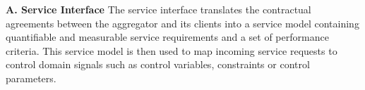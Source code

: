 \textbf{A. Service Interface}
The service interface translates the contractual agreements between the aggregator and its clients into a service model containing quantifiable and measurable service requirements and a set of performance criteria. This service model is then used to map incoming service requests to control domain signals such as control variables, constraints or control parameters.
